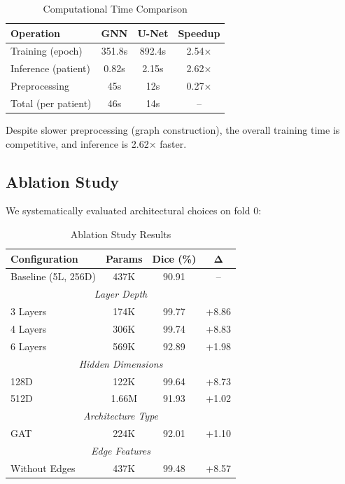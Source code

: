 \documentclass[conference]{IEEEtran}
\begin{document}
\begin{table}[h]
\centering
\caption{Computational Time Comparison}
\label{tab:time}
\begin{tabular}{lccc}
\toprule
\textbf{Operation} & \textbf{GNN} & \textbf{U-Net} & \textbf{Speedup} \\
\midrule
Training (epoch) & 351.8s & 892.4s & 2.54× \\
Inference (patient) & 0.82s & 2.15s & 2.62× \\
Preprocessing & 45s & 12s & 0.27× \\
\midrule
Total (per patient) & 46s & 14s & -- \\
\bottomrule
\end{tabular}
\end{table}

Despite slower preprocessing (graph construction), the overall training time is competitive, and inference is 2.62× faster.

\subsection{Ablation Study}

We systematically evaluated architectural choices on fold 0:

\begin{table}[h]
\centering
\caption{Ablation Study Results}
\label{tab:ablation}
\begin{tabular}{lccc}
\toprule
\textbf{Configuration} & \textbf{Params} & \textbf{Dice (\%)} & \textbf{Δ} \\
\midrule
Baseline (5L, 256D) & 437K & 90.91 & -- \\
\midrule
\multicolumn{4}{c}{\textit{Layer Depth}} \\
\midrule
3 Layers & 174K & 99.77 & +8.86 \\
4 Layers & 306K & 99.74 & +8.83 \\
6 Layers & 569K & 92.89 & +1.98 \\
\midrule
\multicolumn{4}{c}{\textit{Hidden Dimensions}} \\
\midrule
128D & 122K & 99.64 & +8.73 \\
512D & 1.66M & 91.93 & +1.02 \\
\midrule
\multicolumn{4}{c}{\textit{Architecture Type}} \\
\midrule
GAT & 224K & 92.01 & +1.10 \\
\midrule
\multicolumn{4}{c}{\textit{Edge Features}} \\
\midrule
Without Edges & 437K & 99.48 & +8.57 \\
\bottomrule
\end{tabular}
\end{table}
\end{document}
